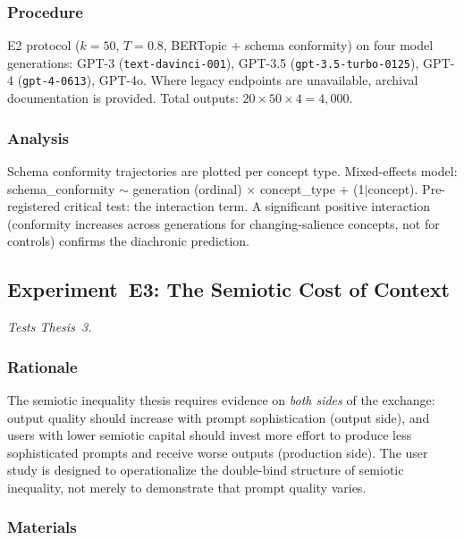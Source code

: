 \documentclass[12pt,a4paper]{article}
\begin{document}
\subsubsection{Procedure}

E2 protocol ($k = 50$, $T = 0.8$, BERTopic + schema conformity) on four
model generations: GPT-3 (\texttt{text-davinci-001}), GPT-3.5
(\texttt{gpt-3.5-turbo-0125}), GPT-4 (\texttt{gpt-4-0613}), GPT-4o. Where
legacy endpoints are unavailable, archival documentation is provided.
Total outputs: $20 \times 50 \times 4 = 4{,}000$.

\subsubsection{Analysis}

Schema conformity trajectories are plotted per concept type. Mixed-effects
model: schema\_conformity $\sim$ generation (ordinal) $\times$
concept\_type + (1$|$concept). Pre-registered critical test: the interaction
term. A significant positive interaction (conformity increases across
generations for changing-salience concepts, not for controls) confirms the
diachronic prediction.

\subsection{Experiment~E3: The Semiotic Cost of Context}
\label{sec:exp3}

\emph{Tests Thesis~3.}

\subsubsection{Rationale}

The semiotic inequality thesis requires evidence on \emph{both sides} of the
exchange: output quality should increase with prompt sophistication (output
side), and users with lower semiotic capital should invest more effort to
produce less sophisticated prompts and receive worse outputs (production side).
The user study is designed to operationalize the double-bind structure of
semiotic inequality, not merely to demonstrate that prompt quality varies.

\subsubsection{Materials}
\end{document}
